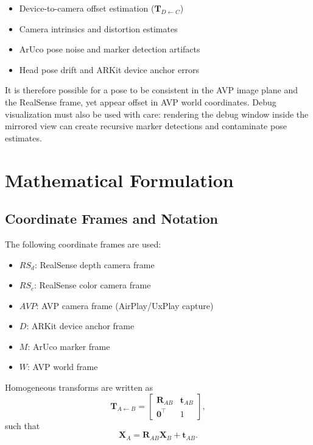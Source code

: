 \documentclass[11pt]{article}
\begin{document}
\begin{itemize}
    \item Device-to-camera offset estimation ($\mathbf{T}_{D \leftarrow C}$)
    \item Camera intrinsics and distortion estimates
    \item ArUco pose noise and marker detection artifacts
    \item Head pose drift and ARKit device anchor errors
\end{itemize}

It is therefore possible for a pose to be consistent in the AVP image plane and the RealSense frame, yet appear offset in AVP world coordinates. Debug visualization must also be used with care: rendering the debug window inside the mirrored view can create recursive marker detections and contaminate pose estimates.

\appendix

\section{Mathematical Formulation}

\subsection{Coordinate Frames and Notation}

The following coordinate frames are used:

\begin{itemize}
    \item $RS_d$: RealSense depth camera frame
    \item $RS_c$: RealSense color camera frame
    \item $AVP$: AVP camera frame (AirPlay/UxPlay capture)
    \item $D$: ARKit device anchor frame
    \item $M$: ArUco marker frame
    \item $W$: AVP world frame
\end{itemize}

Homogeneous transforms are written as
\[
\mathbf{T}_{A \leftarrow B} =
\begin{bmatrix}
\mathbf{R}_{AB} & \mathbf{t}_{AB} \\
\mathbf{0}^\top & 1
\end{bmatrix},
\]
such that
\[
\mathbf{X}_A = \mathbf{R}_{AB} \mathbf{X}_B + \mathbf{t}_{AB}.
\]
\end{document}
